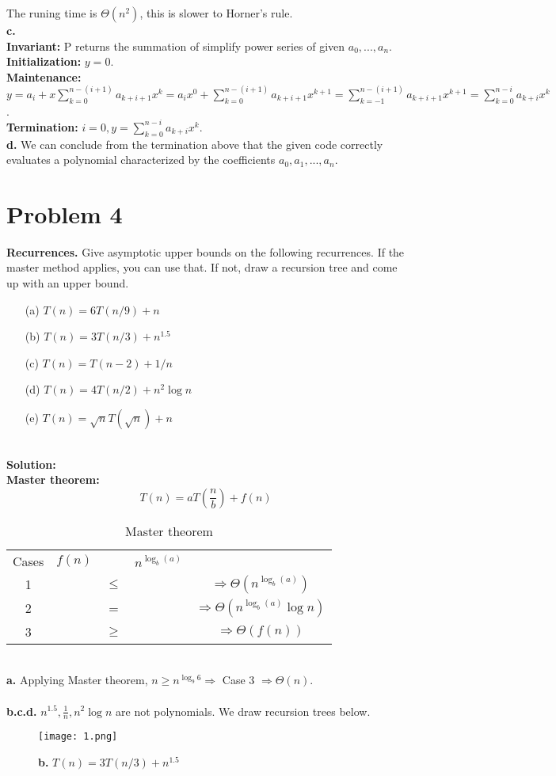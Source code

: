 \documentclass{article}
\theoremstyle{plain}
\begin{document}
The runing time is $\Theta(n^2)$, this is slower to Horner's rule.\\
\textbf{c.\\}
\textbf{Invariant:} P returns the summation of simplify power series of given $a_0,..., a_n$.\\
\textbf{Initialization:} $y = 0$.\\
\textbf{Maintenance:} $y = a_i +x\sum_{k=0}^{n-(i+1)} a_{k+i+1}x^k=a_ix^0 +\sum_{k=0}^{n-(i+1)} a_{k+i+1}x^{k+1}=\sum_{k=-1}^{n-(i+1)} a_{k+i+1}x^{k+1}=\sum_{k=0}^{n-i} a_{k+i}x^k$.\\
\textbf{Termination:} $i = 0, y = \sum_{k=0}^{n-i} a_{k+i}x^k$.\\
\textbf{d.} We can conclude from the termination above that the given code correctly evaluates a  polynomial characterized by the coefficients $a_0, a_1,..., a_n$.\\

\section*{Problem 4}
\textbf{Recurrences.} Give asymptotic upper bounds on the following recurrences. If the master method applies, you can use that. If not, draw a recursion tree and come up with an upper bound.
\begin{enumerate}
    \item[(a)] $T(n) = 6T(n/9) + n$
    \item[(b)] $T(n) = 3T(n/3) + n^{1.5}$
    \item[(c)] $T(n) = T(n - 2) + 1/n$
    \item[(d)] $T(n) = 4T(n/2) + n^2 \log n$
    \item[(e)] $T(n) = \sqrt{n}T(\sqrt{n}) + n$
\end{enumerate}
\textbf{\\Solution:\\}
\textbf{Master theorem:}
\[
T(n) = aT\left(\frac{n}{b}\right) + f(n)
\]
\begin{table}[h]
  \centering
  \begin{tabular}{ccccc}
    Cases & $f(n)$ & & $n^{\log_b(a)}$ & \\
    1 & & $\leq$ & & $\Rightarrow \Theta(n^{\log_b(a)})$ \\
    2 & & = & &$\Rightarrow \Theta(n^{\log_b(a)} \log n)$ \\
    3 & & $\geq$ & & $\Rightarrow \Theta(f(n))$ \\
  \end{tabular}
  \caption{Master theorem}
  \label{tab:Master-theorem}
\end{table}
\textbf{\\a.} Applying Master theorem, $n \geq n^{\log_9 {6}} \Rightarrow$ Case 3 $\Rightarrow \Theta(n)$.\\
\textbf{\\b.c.d.} $n^{1.5}, \frac{1}{n}, n^2 \log n$ are not polynomials. We draw recursion trees below.\\
    \begin{figure}
    \centering
    \texttt{[image: 1.png]}
    \caption{\textbf{b.} $T(n) = 3T(n/3) + n^{1.5}$}
    \label{fig:example}
    \end{figure}
\end{document}
